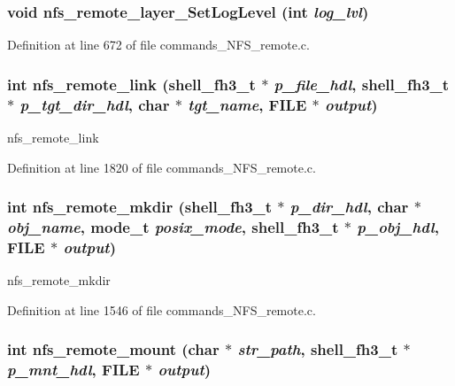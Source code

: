 \subsubsection[{nfs\_\-remote\_\-layer\_\-SetLogLevel}]{\setlength{\rightskip}{0pt plus 5cm}void nfs\_\-remote\_\-layer\_\-SetLogLevel (int {\em log\_\-lvl})}\label{commands__NFS__remote_8c_afddec7649e50bfe452db28ba44df4b7}




Definition at line 672 of file commands\_\-NFS\_\-remote.c.
\subsubsection[{nfs\_\-remote\_\-link}]{\setlength{\rightskip}{0pt plus 5cm}int nfs\_\-remote\_\-link ({\bf shell\_\-fh3\_\-t} $\ast$ {\em p\_\-file\_\-hdl}, \/  {\bf shell\_\-fh3\_\-t} $\ast$ {\em p\_\-tgt\_\-dir\_\-hdl}, \/  char $\ast$ {\em tgt\_\-name}, \/  FILE $\ast$ {\em output})}\label{commands__NFS__remote_8c_bb1887d7a1e37944f0fdffe3877a6a6d}


nfs\_\-remote\_\-link 

Definition at line 1820 of file commands\_\-NFS\_\-remote.c.
\subsubsection[{nfs\_\-remote\_\-mkdir}]{\setlength{\rightskip}{0pt plus 5cm}int nfs\_\-remote\_\-mkdir ({\bf shell\_\-fh3\_\-t} $\ast$ {\em p\_\-dir\_\-hdl}, \/  char $\ast$ {\em obj\_\-name}, \/  mode\_\-t {\em posix\_\-mode}, \/  {\bf shell\_\-fh3\_\-t} $\ast$ {\em p\_\-obj\_\-hdl}, \/  FILE $\ast$ {\em output})}\label{commands__NFS__remote_8c_36f734ba36ffccc1e741e6ffd8e6573e}


nfs\_\-remote\_\-mkdir 

Definition at line 1546 of file commands\_\-NFS\_\-remote.c.
\subsubsection[{nfs\_\-remote\_\-mount}]{\setlength{\rightskip}{0pt plus 5cm}int nfs\_\-remote\_\-mount (char $\ast$ {\em str\_\-path}, \/  {\bf shell\_\-fh3\_\-t} $\ast$ {\em p\_\-mnt\_\-hdl}, \/  FILE $\ast$ {\em output})}\label{commands__NFS__remote_8c_7eb0220c01214de19ba46e2800f93f58}


